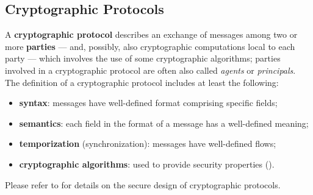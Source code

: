 \subsection{Cryptographic Protocols}\label{sec:cryptography_basics:protocols}

A \textbf{cryptographic protocol} describes an exchange of messages among two or more \textbf{parties} --- and, possibly, also cryptographic computations local to each party --- which involves the use of some cryptographic algorithms; parties involved in a cryptographic protocol are often also called \textit{agents} or \textit{principals}. The definition of a cryptographic protocol includes at least the following:

\begin{itemize}
	\item \textbf{syntax}: messages have well-defined format comprising specific fields;
	\item \textbf{semantics}: each field in the format of a message has a well-defined meaning;
	\item \textbf{temporization} (synchronization): messages have well-defined flows;
	\item \textbf{cryptographic algorithms}: used to provide security properties ().
\end{itemize}

Please refer to  for details on the secure design of cryptographic protocols.

